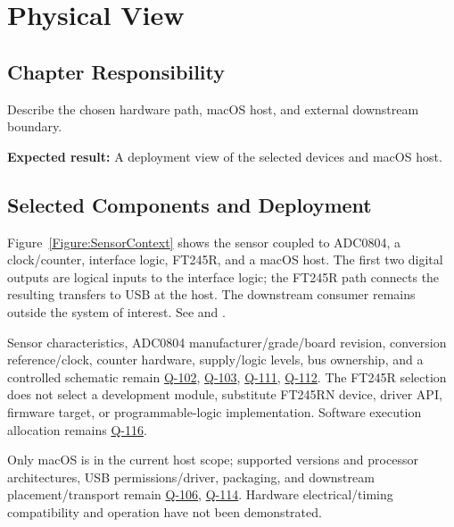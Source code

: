 \chapter{Physical View}
\section{Chapter Responsibility}
\label{Section:PhysicalViewResponsibility}
Describe the chosen hardware path, macOS host, and external downstream boundary.

\noindent\textbf{Expected result:} A deployment view of the selected devices and macOS host.

\section{Selected Components and Deployment}
Figure~\ref{Figure:SensorContext} shows the sensor coupled to ADC0804, a clock/counter, interface logic, FT245R, and a macOS host. The first two digital outputs are logical inputs to the interface logic; the FT245R path connects the resulting transfers to USB at the host. The downstream consumer remains outside the system of interest. See  and .

Sensor characteristics, ADC0804 manufacturer/grade/board revision, conversion reference/clock, counter hardware, supply/logic levels, bus ownership, and a controlled schematic remain \hyperref[Question:Q-102]{Q-102}, \hyperref[Question:Q-103]{Q-103}, \hyperref[Question:Q-111]{Q-111}, \hyperref[Question:Q-112]{Q-112}. The FT245R selection does not select a development module, substitute FT245RN device, driver API, firmware target, or programmable-logic implementation. Software execution allocation remains \hyperref[Question:Q-116]{Q-116}.

Only macOS is in the current host scope; supported versions and processor architectures, USB permissions/driver, packaging, and downstream placement/transport remain \hyperref[Question:Q-106]{Q-106}, \hyperref[Question:Q-114]{Q-114}. Hardware electrical/timing compatibility and operation have not been demonstrated.

